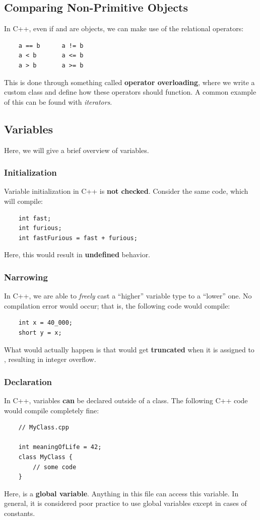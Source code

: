 \documentclass[letterpaper]{article}
\begin{document}
\subsection{Comparing Non-Primitive Objects}
In C++, even if  and  are objects, we can make use of the relational operators:
\begin{verbatim}
    a == b      a != b
    a < b       a <= b
    a > b       a >= b
\end{verbatim}
This is done through something called \textbf{operator overloading}, where we write a custom class and define how these operators should function. A common example of this can be found with \emph{iterators}. 

\subsection{Variables}
Here, we will give a brief overview of variables. 

\subsubsection{Initialization}
Variable initialization in C++ is \textbf{not checked}. Consider the same code, which will compile:
\begin{verbatim}
    int fast;
    int furious; 
    int fastFurious = fast + furious;
\end{verbatim}
Here, this would result in \textbf{undefined} behavior.

\subsubsection{Narrowing}
In C++, we are able to \emph{freely} cast a ``higher'' variable type to a ``lower'' one. No compilation error would occur; that is, the following code would compile:
\begin{verbatim}
    int x = 40_000;
    short y = x;
\end{verbatim}
What would actually happen is that  would get \textbf{truncated} when it is assigned to , resulting in integer overflow. 

\subsubsection{Declaration}
In C++, variables \textbf{can} be declared outside of a class. The following C++ code would compile completely fine: 
\begin{verbatim}
    // MyClass.cpp

    int meaningOfLife = 42;
    class MyClass {
        // some code 
    }
\end{verbatim}
Here,  is a \textbf{global variable}. Anything in this file can access this variable. In general, it is considered poor practice to use global variables except in cases of constants. 
\end{document}
